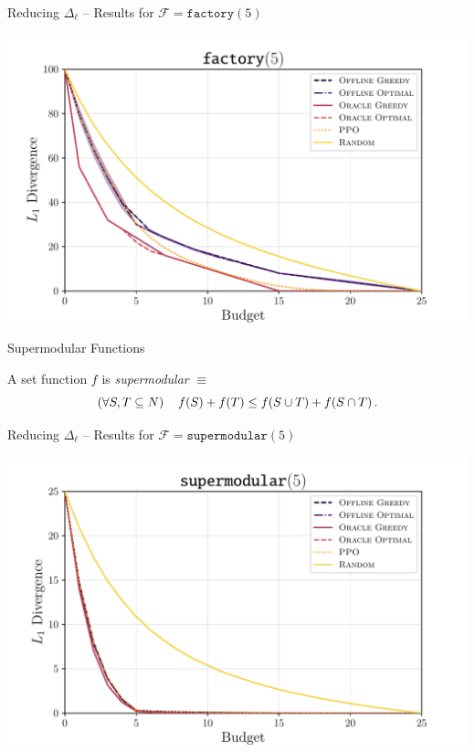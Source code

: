 \documentclass[aspectratio=169]{beamer}
\begin{document}
\begin{frame}{Reducing $ \Delta_\ell $ -- Results for $ \mathcal{F} = \texttt{factory} (5) $}
	\begin{center}
		\includegraphics[width=.8\textwidth]{figures/l1_norm_predictible_factory5.pdf}
	\end{center}
\end{frame}

\begin{frame}{Supermodular Functions}
	\begin{definition}
		A set function $ f $ is \emph{supermodular} $ \equiv $ \[
			\left( \forall S,T \subseteq N \right)\quad f\!\left(S\right) + f\!\left(T\right) \leq f\!\left(S \cup T\right) + f\!\left(S \cap T\right).
		\]
	\end{definition}
	
\end{frame}

\begin{frame}{Reducing $ \Delta_\ell $ -- Results for $ \mathcal{F} = \texttt{supermodular} (5) $}
	\begin{center}
		\includegraphics[width=.8\textwidth]{figures/l1_norm_convex5.pdf}
	\end{center}
\end{frame}
\end{document}
